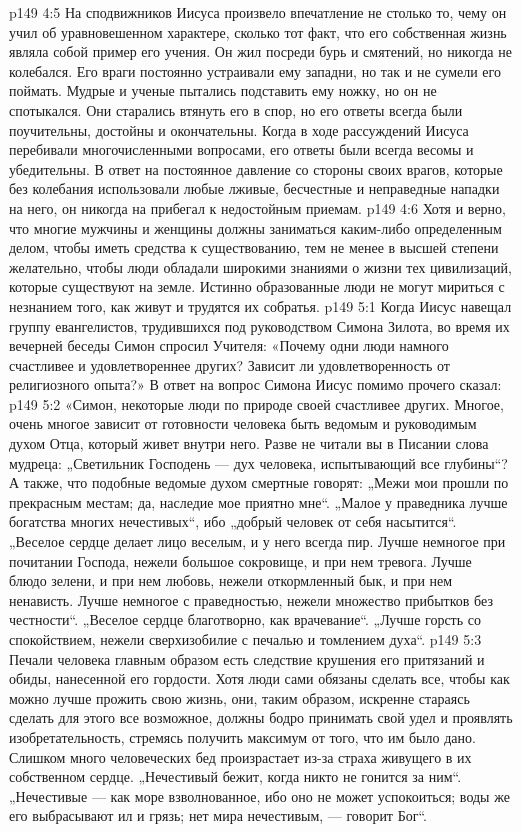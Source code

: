 \vs p149 4:5 На сподвижников Иисуса произвело впечатление не столько то, чему он учил об уравновешенном характере, сколько тот факт, что его собственная жизнь являла собой пример его учения. Он жил посреди бурь и смятений, но никогда не колебался. Его враги постоянно устраивали ему западни, но так и не сумели его поймать. Мудрые и ученые пытались подставить ему ножку, но он не спотыкался. Они старались втянуть его в спор, но его ответы всегда были поучительны, достойны и окончательны. Когда в ходе рассуждений Иисуса перебивали многочисленными вопросами, его ответы были всегда весомы и убедительны. В ответ на постоянное давление со стороны своих врагов, которые без колебания использовали любые лживые, бесчестные и неправедные нападки на него, он никогда на прибегал к недостойным приемам.
\vs p149 4:6 Хотя и верно, что многие мужчины и женщины должны заниматься каким\hyp{}либо определенным делом, чтобы иметь средства к существованию, тем не менее в высшей степени желательно, чтобы люди обладали широкими знаниями о жизни тех цивилизаций, которые существуют на земле. Истинно образованные люди не могут мириться с незнанием того, как живут и трудятся их собратья.
\vs p149 5:1 Когда Иисус навещал группу евангелистов, трудившихся под руководством Симона Зилота, во время их вечерней беседы Симон спросил Учителя: «Почему одни люди намного счастливее и удовлетвореннее других? Зависит ли удовлетворенность от религиозного опыта?» В ответ на вопрос Симона Иисус помимо прочего сказал:
\vs p149 5:2 \pc «Симон, некоторые люди по природе своей счастливее других. Многое, очень многое зависит от готовности человека быть ведомым и руководимым духом Отца, который живет внутри него. Разве не читали вы в Писании слова мудреца: „Светильник Господень --- дух человека, испытывающий все глубины“? А также, что подобные ведомые духом смертные говорят: „Межи мои прошли по прекрасным местам; да, наследие мое приятно мне“. „Малое у праведника лучше богатства многих нечестивых“, ибо „добрый человек от себя насытится“. „Веселое сердце делает лицо веселым, и у него всегда пир. Лучше немногое при почитании Господа, нежели большое сокровище, и при нем тревога. Лучше блюдо зелени, и при нем любовь, нежели откормленный бык, и при нем ненависть. Лучше немногое с праведностью, нежели множество прибытков без честности“. „Веселое сердце благотворно, как врачевание“. „Лучше горсть со спокойствием, нежели сверхизобилие с печалью и томлением духа“.
\vs p149 5:3 Печали человека главным образом есть следствие крушения его притязаний и обиды, нанесенной его гордости. Хотя люди сами обязаны сделать все, чтобы как можно лучше прожить свою жизнь, они, таким образом, искренне стараясь сделать для этого все возможное, должны бодро принимать свой удел и проявлять изобретательность, стремясь получить максимум от того, что им было дано. Слишком много человеческих бед произрастает из\hyp{}за страха живущего в их собственном сердце. „Нечестивый бежит, когда никто не гонится за ним“. „Нечестивые --- как море взволнованное, ибо оно не может успокоиться; воды же его выбрасывают ил и грязь; нет мира нечестивым, --- говорит Бог“.
